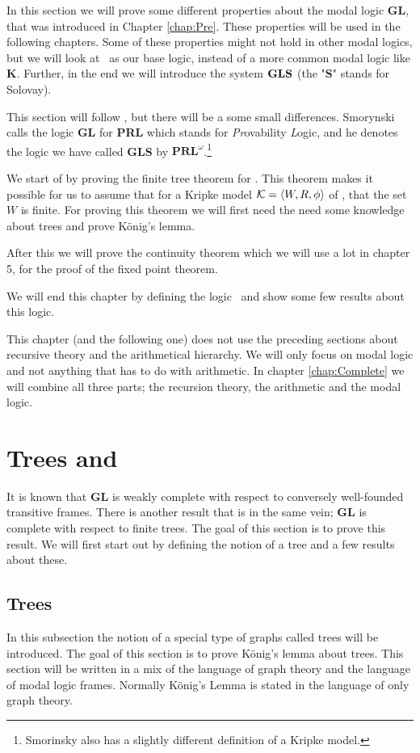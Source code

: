\documentclass[../main.tex]{subfiles}
\begin{document}
In this section we will prove some different properties about the modal logic
\textbf{GL}, that was introduced in Chapter \ref{chap:Pre}.
These properties will be used in the following chapters. Some of these
properties might not
hold in other modal logics, but we will look at \GL\ as our base logic,
instead of a more common modal logic like \textbf{K}.
Further, in the end we will introduce the system $\text{\textbf{GLS}}$ (the
"\textbf{S}" stands for Solovay).

This section will follow \parencite{Smor1985}, but there will be a some small
differences. Smorynski calls the logic \textbf{GL} for \textbf{PRL} which
stands for \textit{Pr}ovability \textit{L}ogic, and he denotes the logic we
have called \textbf{GLS} by $\textbf{PRL}^\omega$.\footnote{Smorinsky also has a
slightly different definition of a Kripke model.}

We start of by proving the finite tree theorem for \GL. This theorem makes it
possible for us to assume that for a Kripke model $\mathcal{K}=\langle W,R,\phi\rangle$ of
\GL, that the set $W$ is finite. For proving this theorem we will first need
the need some knowledge about trees and
prove König's lemma.

After this we will prove the continuity theorem which we will use a lot in
chapter 5, for the proof of the fixed point theorem.

We will end this chapter by defining the logic \GLS\ and show some few results
about this logic.

This chapter (and the following one) does not use the preceding sections about
recursive theory and the arithmetical hierarchy. We will only
focus on modal logic and not anything that has to do with arithmetic. In
chapter \ref{chap:Complete} we will combine all three parts; the recursion
theory, the arithmetic and the modal logic.


\section{Trees and \GL}

It is known that \textbf{GL} is weakly complete with respect to conversely
well-founded transitive frames. There is another result that is in the same
vein; \textbf{GL} is complete with respect to finite trees. The goal of this
section is to prove this result. We will first start out by defining the notion
of a tree and a few results about these.

\subsection{Trees}
In this subsection the notion of a special type of graphs called trees will be
introduced. The goal of this section is to prove König's lemma about trees. 
This section will be written in a mix of the language of graph theory and the
language of modal logic frames. Normally König's Lemma is stated in the
language of only graph theory.
\end{document}
